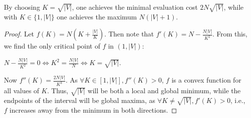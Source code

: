 \begin{lemma}
    \label{lemma:min_max_evaluation_cost}
    By choosing $K=\sqrt{|V|}$, one achieves the minimal evaluation cost $2 N \sqrt{|V|}$, while with $K \in \{1, |V|\}$ one achieves the maximum $N(|V| + 1)$.
\end{lemma}
\begin{proof}
    Let $f(K) = N(K + \frac{|V|}{K})$. Then note that $f'(K) = N - \frac{N |V|}{K^2}$. From this, we find the only critical point of $f$ in $(1, |V|)$: 
    
    $N - \frac{N |V|}{K^2} = 0 \Leftrightarrow K^2 = \frac{N |V|}{N} \Leftrightarrow K = \sqrt{|V|}$. 
    
    Now $f''(K)=\frac{2 N |V|}{K^3}$. As $\forall K \in [1, |V|], f''(K) > 0$, $f$ is a convex function for all values of $K$. Thus, $\sqrt{|V|}$ will be both a local and global minimum, while the endpoints of the interval will be global maxima, as $\forall K \neq \sqrt{|V|}, f'(K) > 0$, i.e., $f$ increases away from the minimum in both directions.
\end{proof}


